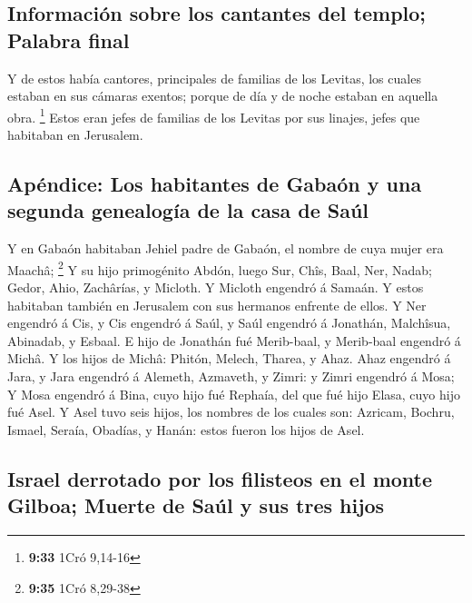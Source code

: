 \hypertarget{informaciuxf3n-sobre-los-cantantes-del-templo-palabra-final}{%
\subsection{Información sobre los cantantes del templo; Palabra
final}\label{informaciuxf3n-sobre-los-cantantes-del-templo-palabra-final}}

 Y de estos había cantores, principales de familias de
los Levitas, los cuales estaban en sus cámaras exentos; porque de día y
de noche estaban en aquella obra. \footnote{\textbf{9:33} 1Cró 9,14-16}
 Estos eran jefes de familias de los Levitas por sus
linajes, jefes que habitaban en Jerusalem.

\hypertarget{apuxe9ndice-los-habitantes-de-gabauxf3n-y-una-segunda-genealoguxeda-de-la-casa-de-sauxfal}{%
\subsection{Apéndice: Los habitantes de Gabaón y una segunda genealogía
de la casa de
Saúl}\label{apuxe9ndice-los-habitantes-de-gabauxf3n-y-una-segunda-genealoguxeda-de-la-casa-de-sauxfal}}

 Y en Gabaón habitaban Jehiel padre de Gabaón, el nombre
de cuya mujer era Maachâ; \footnote{\textbf{9:35} 1Cró 8,29-38}
 Y su hijo primogénito Abdón, luego Sur, Chîs, Baal, Ner,
Nadab;  Gedor, Ahio, Zachârías, y Micloth.
 Y Micloth engendró á Samaán. Y estos habitaban también
en Jerusalem con sus hermanos enfrente de ellos.  Y Ner
engendró á Cis, y Cis engendró á Saúl, y Saúl engendró á Jonathán,
Malchîsua, Abinadab, y Esbaal.  E hijo de Jonathán fué
Merib-baal, y Merib-baal engendró á Michâ.  Y los hijos
de Michâ: Phitón, Melech, Tharea, y Ahaz.  Ahaz engendró
á Jara, y Jara engendró á Alemeth, Azmaveth, y Zimri: y Zimri engendró á
Mosa;  Y Mosa engendró á Bina, cuyo hijo fué Rephaía, del
que fué hijo Elasa, cuyo hijo fué Asel.  Y Asel tuvo seis
hijos, los nombres de los cuales son: Azricam, Bochru, Ismael, Seraía,
Obadías, y Hanán: estos fueron los hijos de Asel.

\hypertarget{israel-derrotado-por-los-filisteos-en-el-monte-gilboa-muerte-de-sauxfal-y-sus-tres-hijos}{%
\subsection{Israel derrotado por los filisteos en el monte Gilboa;
Muerte de Saúl y sus tres
hijos}\label{israel-derrotado-por-los-filisteos-en-el-monte-gilboa-muerte-de-sauxfal-y-sus-tres-hijos}}


